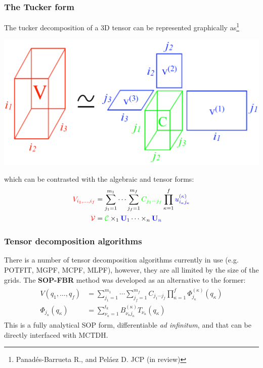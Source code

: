 \documentclass{beamer}
\begin{document}
\begin{frame}
  \frametitle{The Tucker form}
  The tucker decomposition of a 3D tensor can be represented graphically as\footnote{Panadés-Barrueta R., and Peláez D. JCP (in review)}
  \begin{center}
  \includegraphics[scale=.1]{tuck.pdf}
\end{center}
which can be contrasted with the algebraic and tensor forms:
\begin{align}
  \label{alg}
  \begin{split}
	\textcolor{red}{V_{i_1,\ldots,i_f}} &= \sum_{j_1=1}^{m_1} \cdots \sum_{j_f=1}^{m_f} \textcolor{green}{C_{j_1 \cdots j_f}}\prod_{\kappa=1}^f \textcolor{blue}{u_{i_{\kappa}j_{\kappa}}^{(\kappa)}}\\
	\textcolor{red}{\mathcal{V}} &= \textcolor{green}{\mathcal{C}} \times_1 \textcolor{blue}{\mathbf{U}_1} \cdots \times_n \textcolor{blue}{\mathbf{U}_n}
  \end{split}
\end{align}
  
\end{frame}

\begin{frame}
  \frametitle{Tensor decomposition algorithms}
  There is a number of tensor decomposition algorithms currently in use (e.g. POTFIT, MGPF, MCPF, MLPF), however, they are all limited by the size of the grids. The \textbf{SOP-FBR} method was developed as an alternative to the former:
\begin{align}
  \label{sopfbr}
  \begin{split}
    V(q_1, \ldots, q_f) &= \sum_{j_1=1}^{m_1} \cdots \sum_{j_f=1}^{m_f} C_{j_1 \cdots j_f}\prod_{\kappa=1}^f \Phi_{j_{\kappa}}^{(\kappa)}(q_{\kappa})\\
    \Phi_{j_{\kappa}}(q_{\kappa}) &= \sum_{\nu_{\kappa}=1}^{t_k}B_{\nu_{\kappa}j_{\kappa}}^{(\kappa)}T_{\nu_{\kappa}}(q_{\kappa})
  \end{split}
\end{align}
This is a fully analytical SOP form, differentiable \emph{ad infinitum}, and that can be directly interfaced with MCTDH\@.
  
\end{frame}
\end{document}
